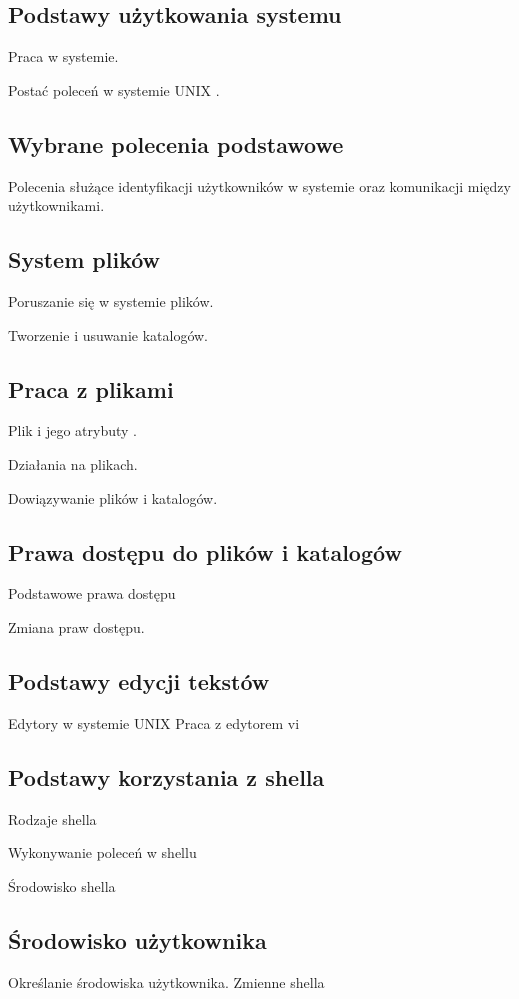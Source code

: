 \documentclass[11pt]{article}
\begin{document}
\subsection{Podstawy użytkowania systemu}
Praca w systemie.

Postać poleceń w systemie UNIX .

\subsection{Wybrane polecenia podstawowe}

Polecenia służące identyfikacji użytkowników w systemie oraz komunikacji między użytkownikami.

\subsection{System plików}

Poruszanie się w systemie plików.

Tworzenie i usuwanie katalogów.

\subsection{Praca z plikami}

Plik i jego atrybuty .

Działania na plikach.

Dowiązywanie plików i katalogów.

\subsection{Prawa dostępu do plików i katalogów}
Podstawowe prawa dostępu

Zmiana praw dostępu.

\subsection{Podstawy edycji tekstów}
Edytory w systemie UNIX
Praca z edytorem vi
\subsection{Podstawy korzystania z shella}
Rodzaje shella

Wykonywanie poleceń w shellu

Środowisko shella
\subsection{Środowisko użytkownika}
Określanie środowiska użytkownika.
Zmienne shella
\end{document}
